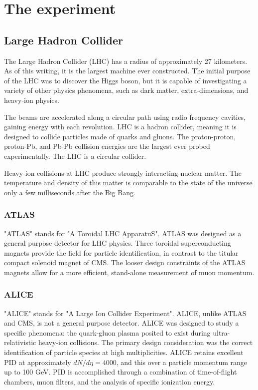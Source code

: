 
\chapter{The experiment}

\section{Large Hadron Collider}

The Large Hadron Collider (LHC) has a radius of approximately 27 kilometers. As of this writing, it is the largest machine ever constructed. The initial purpose of the LHC was to discover the Higgs boson, but it is capable of investigating a variety of other physics phenomena, such as dark matter, extra-dimensions, and heavy-ion physics.

The beams are accelerated along a circular path using radio frequency cavities, gaining energy with each revolution. LHC is a hadron collider, meaning it is designed to collide particles made of quarks and gluons. The proton-proton, proton-Pb, and Pb-Pb collision energies are the largest ever probed experimentally. The LHC is a circular collider.

Heavy-ion collisions at LHC produce strongly interacting nuclear matter. The temperature and density of this matter is comparable to the state of the universe only a few milliseconds after the Big Bang.

\subsection{ATLAS}

"ATLAS" stands for "A Toroidal LHC ApparatuS". ATLAS was designed as a general purpose detector for LHC physics. Three toroidal superconducting magnets provide the field for particle identification, in contrast to the titular compact solenoid magnet of CMS. The looser design constraints of the ATLAS magnets allow for a more efficient, stand-alone measurement of muon momentum. 

\subsection{ALICE}

"ALICE" stands for "A Large Ion Collider Experiment". ALICE, unlike ATLAS and CMS, is not a general purpose detector. ALICE was designed to study a specific phenomena: the quark-gluon plasma posited to exist during ultra-relativistic heavy-ion collisions. The primary design consideration was the correct identification of particle species at high multiplicities. ALICE retains excellent PID at approximately $dN / d\eta = 4000$, and this over a particle momentum range up to 100 GeV. PID is accomplished through a combination of time-of-flight chambers, muon filters, and the analysis of specific ionization energy. 

